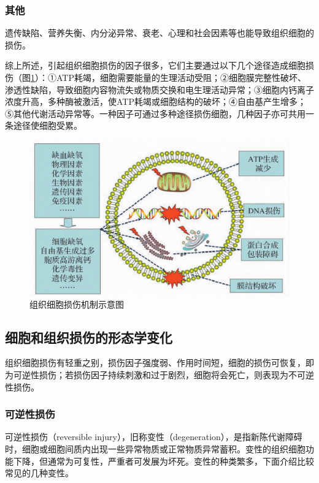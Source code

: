 \subsubsection{其他}

遗传缺陷、营养失衡、内分泌异常、衰老、心理和社会因素等也能导致组织细胞的损伤。

综上所述，引起组织细胞损伤的因子很多，它们主要通过以下几个途径造成细胞损伤（图\ref{fig1-5}）：①ATP耗竭，细胞需要能量的生理活动受阻；②细胞膜完整性破坏、渗透性缺陷，导致细胞内容物流失或物质交换和电生理活动异常；③细胞内钙离子浓度升高，多种酶被激活，使ATP耗竭或细胞结构的破坏；④自由基产生增多；⑤其他代谢活动异常等。一种因子可通过多种途径损伤细胞，几种因子亦可共用一条途径使细胞受累。
\begin{figure}[!htbp]
	\centering
	\includegraphics{./images/Image00006.jpg}
	\caption{组织细胞损伤机制示意图}
	\label{fig1-5}
\end{figure}

\subsection{细胞和组织损伤的形态学变化}

组织细胞损伤有轻重之别，损伤因子强度弱、作用时间短，细胞的损伤可恢复，即为可逆性损伤；若损伤因子持续刺激和过于剧烈，细胞将会死亡，则表现为不可逆性损伤。

\subsubsection{可逆性损伤}

可逆性损伤（reversible
injury），旧称变性（degeneration），是指新陈代谢障碍时，细胞或细胞间质内出现一些异常物质或正常物质异常蓄积。变性的组织细胞功能下降，但通常为可复性，严重者可发展为坏死。变性的种类繁多，下面介绍比较常见的几种变性。

